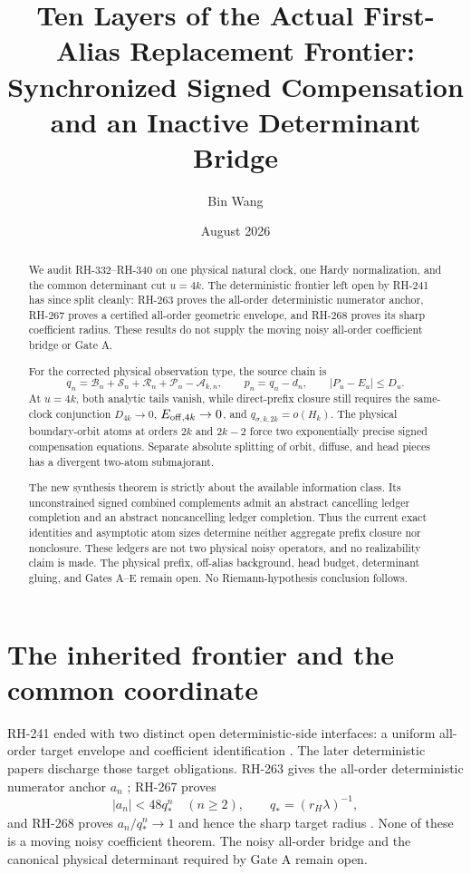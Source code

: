 \documentclass[11pt]{article}
\title{Ten Layers of the Actual First-Alias Replacement Frontier:\\
Synchronized Signed Compensation and an Inactive Determinant Bridge}
\author{Bin Wang}
\date{August 2026}
\theoremstyle{remark}
\newcommand{\cA}{\mathcal A}
\newcommand{\cB}{\mathcal B}
\newcommand{\cP}{\mathcal P}
\newcommand{\cR}{\mathcal R}
\newcommand{\cS}{\mathcal S}
\begin{document}
\maketitle

\begin{abstract}
We audit RH-332--RH-340 on one physical natural clock, one Hardy
normalization, and the common determinant cut $u=4k$.  The deterministic
frontier left open by RH-241 has since split cleanly: RH-263 proves the
all-order deterministic numerator anchor, RH-267 proves a certified
all-order geometric envelope, and RH-268 proves its sharp coefficient
radius.  These results do not supply the moving noisy all-order coefficient
bridge or Gate A.

For the corrected physical observation type, the source chain is
\[
 q_n=\cB_n+\cS_n+\cR_n+\cP_n-\cA_{k,n},
 \qquad p_n=q_n-d_n,
 \qquad |P_u-E_u|\le D_u.
\]
At $u=4k$, both analytic tails vanish, while direct-prefix closure still
requires the same-clock conjunction
$D_{4k}\to0$, $E_{{\rm off},4k}\to0$, and
$q_{\sigma,k,2k}=o(H_k)$.  The physical boundary-orbit atoms at orders
$2k$ and $2k-2$ force two exponentially precise signed compensation
equations.  Separate absolute splitting of orbit, diffuse, and head pieces
has a divergent two-atom submajorant.

The new synthesis theorem is strictly about the available information
class.  Its unconstrained signed combined complements admit an abstract
cancelling ledger completion and an abstract noncancelling ledger
completion.  Thus the current exact identities and asymptotic atom sizes
determine neither aggregate prefix closure nor nonclosure.  These ledgers
are not two physical noisy operators, and no realizability claim is made.
The physical prefix, off-alias background, head budget, determinant gluing,
and Gates A--E remain open.  No Riemann-hypothesis conclusion follows.
\end{abstract}

\section{The inherited frontier and the common coordinate}

RH-241 ended with two distinct open deterministic-side interfaces: a
uniform all-order target envelope and coefficient identification
\citep{WangTraceFrontier2026}.  The later deterministic papers discharge
those target obligations.  RH-263 gives the all-order deterministic
numerator anchor $a_n$ \citep{WangParityAnchor2026}; RH-267 proves
\begin{equation}\label{eq:target-envelope}
 |a_n|<48q_*^n\quad(n\ge2),
 \qquad q_*=(r_H\lambda)^{-1},
\end{equation}
and RH-268 proves $a_n/q_*^n\to1$ and hence the sharp target radius
\citep{WangUnifiedEnvelope2026,WangSharpRadius2026}.  None of these is a
moving noisy coefficient theorem.  The noisy all-order bridge and the
canonical physical determinant required by Gate A remain open.
\end{document}
